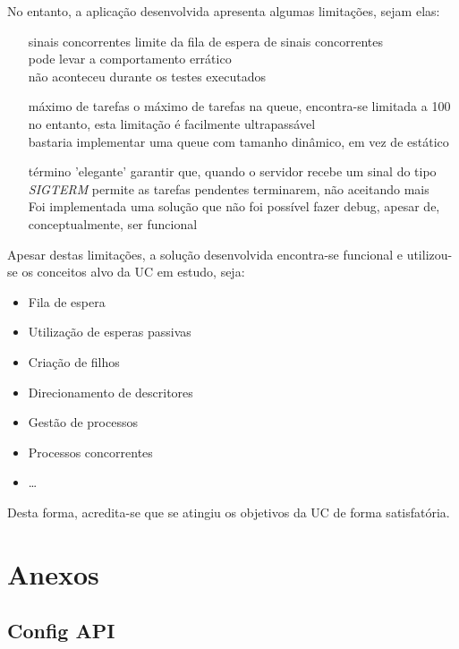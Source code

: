 \documentclass[11pt]{article}
\begin{document}
No entanto, a aplicação desenvolvida apresenta algumas limitações, sejam elas:
\begin{itemize}
    \item[sinais concorrentes] {limite da fila de espera de sinais concorrentes\\
          pode levar a comportamento errático \\
          não aconteceu durante os testes executados}
    \item[máximo de tarefas] {o máximo de tarefas na queue, encontra-se limitada a 100\\
          no entanto, esta limitação é facilmente ultrapassável\\
          bastaria implementar uma queue com tamanho dinâmico, em vez de estático }
    \item[término 'elegante'] {garantir que, quando o servidor recebe um sinal do tipo \textit{SIGTERM} permite as
          tarefas pendentes terminarem, não aceitando mais\\
          Foi implementada uma solução que não foi possível fazer debug, apesar de, conceptualmente, ser funcional}
\end{itemize}

Apesar destas limitações, a solução desenvolvida encontra-se funcional e utilizou-se os conceitos alvo da UC em estudo, seja:
\begin{itemize}
    \item Fila de espera
    \item Utilização de esperas passivas
    \item Criação de filhos
    \item Direcionamento de descritores
    \item Gestão de processos
    \item Processos concorrentes
    \item \dots
\end{itemize}

Desta forma, acredita-se que se atingiu os objetivos da UC de forma satisfatória.

\section{Anexos}

\subsection{Config API} \label{config_api}
\end{document}
